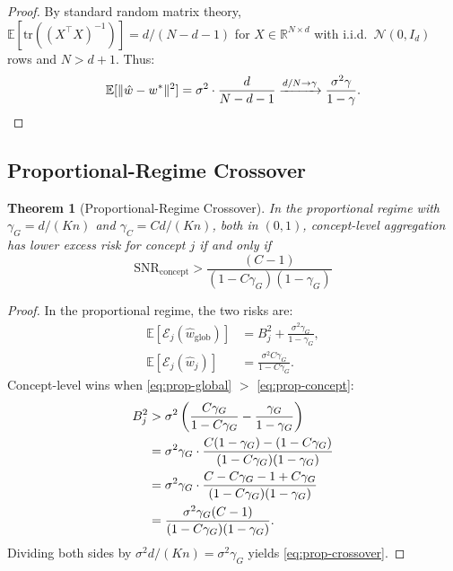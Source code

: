 \documentclass[11pt,a4paper]{article}
\newtheorem{theorem}{Theorem}
\newcommand{\R}{\mathbb{R}}
\newcommand{\E}{\mathbb{E}}
\newcommand{\tr}{\mathrm{tr}}
\newcommand{\SNR}{\mathrm{SNR}}
\newcommand{\what}{\hat{w}}
\newcommand{\Id}{I_d}
\begin{document}
\begin{proof}
By standard random matrix theory, $\E[\tr((X^\top X)^{-1})] = d / (N - d - 1)$ for $X \in \R^{N \times d}$ with i.i.d.\ $\mathcal{N}(0, \Id)$ rows and $N > d + 1$. Thus:
\[
\E[\|\what - w^*\|^2] = \sigma^2 \cdot \frac{d}{N - d - 1} \xrightarrow{d/N \to \gamma} \frac{\sigma^2 \gamma}{1 - \gamma}. \qedhere
\]
\end{proof}

\subsection{Proportional-Regime Crossover}

\begin{theorem}[Proportional-Regime Crossover]\label{thm:prop}
In the proportional regime with $\gamma_G = d/(Kn)$ and $\gamma_C = Cd/(Kn)$, both in $(0,1)$, concept-level aggregation has lower excess risk for concept $j$ if and only if
\begin{equation}\label{eq:prop-crossover}
\boxed{\SNR_{\mathrm{concept}} > \frac{(C - 1)}{(1 - C\gamma_G)(1 - \gamma_G)}}
\end{equation}
\end{theorem}

\begin{proof}
In the proportional regime, the two risks are:
\begin{align}
\E[\mathcal{E}_j(\what_{\mathrm{glob}})] &= B_j^2 + \frac{\sigma^2 \gamma_G}{1 - \gamma_G}, \label{eq:prop-global}\\
\E[\mathcal{E}_j(\what_j)] &= \frac{\sigma^2 C\gamma_G}{1 - C\gamma_G}. \label{eq:prop-concept}
\end{align}
Concept-level wins when \eqref{eq:prop-global} $>$ \eqref{eq:prop-concept}:
\begin{align}
B_j^2 &> \sigma^2 \left(\frac{C\gamma_G}{1 - C\gamma_G} - \frac{\gamma_G}{1 - \gamma_G}\right) \notag\\
&= \sigma^2 \gamma_G \cdot \frac{C(1 - \gamma_G) - (1 - C\gamma_G)}{(1 - C\gamma_G)(1 - \gamma_G)} \notag\\
&= \sigma^2 \gamma_G \cdot \frac{C - C\gamma_G - 1 + C\gamma_G}{(1 - C\gamma_G)(1 - \gamma_G)} \notag\\
&= \frac{\sigma^2 \gamma_G (C - 1)}{(1 - C\gamma_G)(1 - \gamma_G)}.
\end{align}
Dividing both sides by $\sigma^2 d / (Kn) = \sigma^2 \gamma_G$ yields \eqref{eq:prop-crossover}.
\end{proof}
\end{document}
